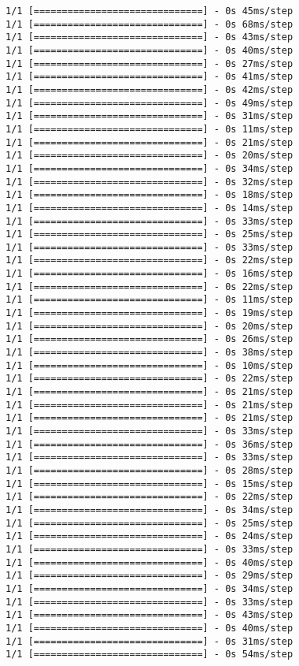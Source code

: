 \documentclass[11pt]{article}
\begin{document}
\begin{Verbatim}[commandchars=\\\{\}]
1/1 [==============================] - 0s 45ms/step
1/1 [==============================] - 0s 68ms/step
1/1 [==============================] - 0s 43ms/step
1/1 [==============================] - 0s 40ms/step
1/1 [==============================] - 0s 27ms/step
1/1 [==============================] - 0s 41ms/step
1/1 [==============================] - 0s 42ms/step
1/1 [==============================] - 0s 49ms/step
1/1 [==============================] - 0s 31ms/step
1/1 [==============================] - 0s 11ms/step
1/1 [==============================] - 0s 21ms/step
1/1 [==============================] - 0s 20ms/step
1/1 [==============================] - 0s 34ms/step
1/1 [==============================] - 0s 32ms/step
1/1 [==============================] - 0s 18ms/step
1/1 [==============================] - 0s 14ms/step
1/1 [==============================] - 0s 33ms/step
1/1 [==============================] - 0s 25ms/step
1/1 [==============================] - 0s 33ms/step
1/1 [==============================] - 0s 22ms/step
1/1 [==============================] - 0s 16ms/step
1/1 [==============================] - 0s 22ms/step
1/1 [==============================] - 0s 11ms/step
1/1 [==============================] - 0s 19ms/step
1/1 [==============================] - 0s 20ms/step
1/1 [==============================] - 0s 26ms/step
1/1 [==============================] - 0s 38ms/step
1/1 [==============================] - 0s 10ms/step
1/1 [==============================] - 0s 22ms/step
1/1 [==============================] - 0s 21ms/step
1/1 [==============================] - 0s 21ms/step
1/1 [==============================] - 0s 21ms/step
1/1 [==============================] - 0s 33ms/step
1/1 [==============================] - 0s 36ms/step
1/1 [==============================] - 0s 33ms/step
1/1 [==============================] - 0s 28ms/step
1/1 [==============================] - 0s 15ms/step
1/1 [==============================] - 0s 22ms/step
1/1 [==============================] - 0s 34ms/step
1/1 [==============================] - 0s 25ms/step
1/1 [==============================] - 0s 24ms/step
1/1 [==============================] - 0s 33ms/step
1/1 [==============================] - 0s 40ms/step
1/1 [==============================] - 0s 29ms/step
1/1 [==============================] - 0s 34ms/step
1/1 [==============================] - 0s 33ms/step
1/1 [==============================] - 0s 43ms/step
1/1 [==============================] - 0s 40ms/step
1/1 [==============================] - 0s 31ms/step
1/1 [==============================] - 0s 54ms/step

\end{Verbatim}
\end{document}
